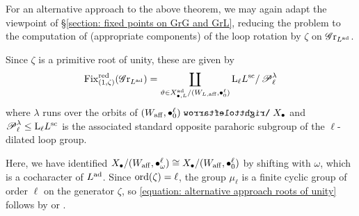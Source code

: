\begin{remark}
For an alternative approach to the above theorem, we may again adapt the viewpoint of \S \ref{section: fixed points on GrG and GrL}, reducing the problem to the computation of (appropriate components) of the loop rotation by $\zeta$ on $\operatorname{\mathscr{G}r}_{L^{\operatorname{ad}}}$.

Since $\zeta$ is a primitive root of unity, these are given by
\begin{equation}\label{equation: alternative approach roots of unity}
    \operatorname{Fix}^{\operatorname{red}}_{(1, \zeta)}(\operatorname{\mathscr{G}r}_{L^{\operatorname{ad}}}) = \coprod_{\vartheta \in X^{\operatorname{ad}}_{\bullet, L}/ (W_{L, \mathrm{aff}}, \bullet^{\ell}_0)} \mathrm{L}_{\ell} L^{\mathrm{sc}}/\operatorname{\mathscr{P}}^{\lambda}_{\ell}
\end{equation}
where $\lambda$ runs over the orbits of $(W_{\aff}, \bullet^{\ell}_0) \acts X_{\bullet}$ and $\operatorname{\mathscr{P}}^{\lambda}_{\ell} \leq \mathrm{L}_{\ell} L^{\mathrm{sc}}$ is the associated standard opposite parahoric subgroup of the $\ell$-dilated loop group.

Here, we have identified $ X_{\bullet}/ (W_{\mathrm{aff}}, \bullet^{\ell}_{\omega}) \cong X_{\bullet}/ (W_{\mathrm{aff}}, \bullet^{\ell}_{0})$ by shifting with $\omega$, which is a cocharacter of $L^{\operatorname{ad}}$. 
Since $\mathrm{ord}(\zeta) = \ell$, the group $\mu_{\ell}$ is a finite cyclic group of order $\ell$ on the generator $\zeta$, so \eqref{equation: alternative approach roots of unity} follows by \cite[\S 1.6, \S 4.6]{RW22} or \cite[\S 2.1.4]{BBSV22}.
\end{remark}


